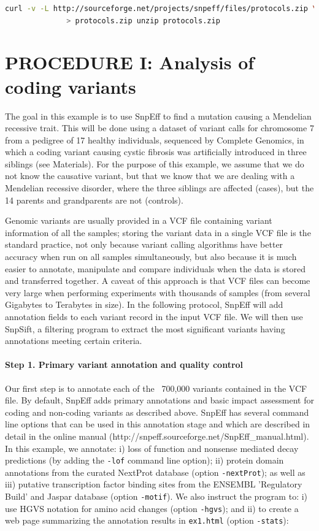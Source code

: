 \begin{lstlisting}[language=bash]
curl -v -L http://sourceforge.net/projects/snpeff/files/protocols.zip \
              > protocols.zip unzip protocols.zip
\end{lstlisting}

\section{PROCEDURE I: Analysis of coding variants}

The goal in this example is to use SnpEff to find a mutation causing a Mendelian recessive trait. This will be done using a dataset of variant calls for chromosome 7 from a pedigree of 17 healthy individuals, sequenced by Complete Genomics, in which a coding variant causing cystic fibrosis was artificially introduced in three siblings (see Materials). For the purpose of this example, we assume that we do not know the causative variant, but that we know that we are dealing with a Mendelian recessive disorder, where the three siblings are affected (cases), but the 14 parents and grandparents are not (controls).

Genomic variants are usually provided in a VCF file containing variant information of all the samples; storing the variant data in a single VCF file is the standard practice, not only because variant calling algorithms have better accuracy when run on all samples simultaneously, but also because it is much easier to annotate, manipulate and compare individuals when the data is stored and transferred together. A caveat of this approach is that VCF files can become very large when performing experiments with thousands of samples (from several Gigabytes to Terabytes in size). In the following protocol, SnpEff will add annotation fields to each variant record in the input VCF file. We will then use SnpSift, a filtering program to extract the most significant variants having annotations meeting certain criteria.

\paragraph{Step 1. Primary variant annotation and quality control} Our first step is to annotate each of the ~700,000 variants contained in the VCF file. By default, SnpEff adds primary annotations and basic impact assessment for coding and non-coding variants as described above. SnpEff has several command line options that can be used in this annotation stage and which are described in detail in the online manual (http://snpeff.sourceforge.net/SnpEff\_manual.html). In this example, we annotate: i) loss of function and nonsense mediated decay predictions (by adding the \texttt{-lof} command line option); ii) protein domain annotations from the curated NextProt database (option \texttt{-nextProt}); as well as iii)
putative transcription factor binding sites from the ENSEMBL 'Regulatory Build' and Jaspar database (option \texttt{-motif}). We also instruct the program to: i) use HGVS notation for amino acid changes (option \texttt{-hgvs}); and ii) to create a web page summarizing the annotation results in \texttt{ex1.html} (option \texttt{-stats}):

